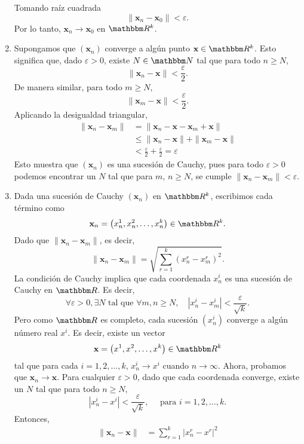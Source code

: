 \begin{enumerate}
    Tomando raíz cuadrada
    $$\|\mathbf{x}_n - \mathbf{x}_0\| < \varepsilon.$$
    Por lo tanto, $\mathbf{x}_n \to \mathbf{x}_0$ en $\RR[k]$.
    \item Supongamos que $(\mathbf{x}_n)$ converge a algún punto $\mathbf{x} \in \RR[k]$. Esto significa que, dado $\varepsilon > 0$, existe $N \in \NN$ tal que para todo $n \geq N$,
    $$\|\mathbf{x}_n - \mathbf{x}\| < \frac{\varepsilon}{2}.$$
    De manera similar, para todo $m \geq N$,
    $$\|\mathbf{x}_m - \mathbf{x}\| < \frac{\varepsilon}{2}.$$
    Aplicando la desigualdad triangular,
    \begin{align*}
        \|\mathbf{x}_n - \mathbf{x}_m\| & = \|\mathbf{x}_n - \mathbf{x} - \mathbf{x}_m + \mathbf{x}\| \\
        & \leq \|\mathbf{x}_n - \mathbf{x}\| + \|\mathbf{x}_m - \mathbf{x}\| \\
        & < \frac{\varepsilon}{2} + \frac{\varepsilon}{2} = \varepsilon
    \end{align*}
    Esto muestra que $(\mathbf{x}_n)$ es una sucesión de Cauchy, pues para todo $\varepsilon > 0$ podemos encontrar un $N$ tal que para $m$, $n \geq N$, se cumple $\|\mathbf{x}_n - \mathbf{x}_m\| < \varepsilon$.
    \item Dada una sucesión de Cauchy $(\mathbf{x}_n)$ en $\RR[k]$, escribimos cada término como
    $$\mathbf{x}_n = \left(x_n^1, x_n^2, \dots, x_n^k\right) \in \RR[k].$$
    Dado que $\|\mathbf{x}_n - \mathbf{x}_m\|$, es decir,
    $$\|\mathbf{x}_n - \mathbf{x}_m\| = \sqrt{\sum_{r = 1}^{k} \left(x_n^r - x_m^r\right)^2}.$$
    La condición de Cauchy implica que cada coordenada $x_n^i$ es una sucesión de Cauchy en $\RR$. Es decir,
    $$\forall \varepsilon > 0, \exists N \text{ tal que } \forall m, n \geq N, \quad \left|x_n^i - x_m^i\right| < \frac{\varepsilon}{\sqrt{k}}.$$
    Pero como $\RR$ es completo, cada sucesión $(x_n^i)$ converge a algún número real $x^i$. Es decir, existe un vector
    $$\mathbf{x} = \left(x^1, x^2, \dots, x^k\right) \in \RR[k]$$
    tal que para cada $i = 1, 2, \dots, k$, $x_n^i \to x^i$ cuando $n \to \infty$. Ahora, probamos que $\mathbf{x}_n \to \mathbf{x}$. Para cualquier $\varepsilon > 0$, dado que cada coordenada converge, existe un $N$ tal que para todo $n \geq N$,
    $$\left|x_n^i - x^i\right| < \frac{\varepsilon}{\sqrt{k}}, \quad \text{ para } i = 1, 2,  \dots, k.$$
    Entonces,
    \begin{align*}
        \|\mathbf{x}_n - \mathbf{x}\| & = \sum_{r = 1}^{k} \left|x_n^r - x^r\right|^2 \\

\end{align*}
\end{enumerate}
